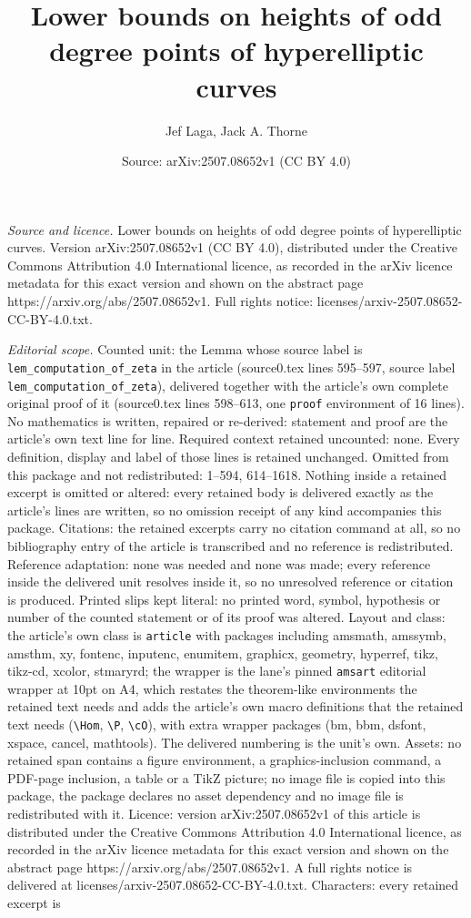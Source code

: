 \documentclass[10pt,a4paper]{amsart}
\title[Lower bounds on heights of odd degree points of hyperellipti]{Lower bounds on heights of odd degree points of hyperelliptic curves}
\author{Jef Laga, Jack A. Thorne}
\date{Source: arXiv:2507.08652v1 (CC BY 4.0)}
\begin{document}
\maketitle

\noindent\emph{Source and licence.} Lower bounds on heights of odd degree points of hyperelliptic curves. Version arXiv:2507.08652v1 (CC BY 4.0), distributed under the Creative Commons Attribution 4.0 International licence, as recorded in the arXiv licence metadata for this exact version and shown on the abstract page https://arxiv.org/abs/2507.08652v1. Full rights notice: licenses/arxiv-2507.08652-CC-BY-4.0.txt.\par\smallskip

\noindent\textit{Editorial scope.} Counted unit: the Lemma whose source label is \texttt{lem\_computation\_of\_zeta} in the article (source0.tex lines 595--597, source label \texttt{lem\_computation\_of\_zeta}), delivered together with the article's own complete original proof of it (source0.tex lines 598--613, one \texttt{proof} environment of 16 lines). No mathematics is written, repaired or re-derived: statement and proof are the article's own text line for line. Required context retained uncounted: none. Every definition, display and label of those lines is retained unchanged. Omitted from this package and not redistributed: 1--594, 614--1618. Nothing inside a retained excerpt is omitted or altered: every retained body is delivered exactly as the article's lines are written, so no omission receipt of any kind accompanies this package. Citations: the retained excerpts carry no citation command at all, so no bibliography entry of the article is transcribed and no reference is redistributed. Reference adaptation: none was needed and none was made; every reference inside the delivered unit resolves inside it, so no unresolved reference or citation is produced. Printed slips kept literal: no printed word, symbol, hypothesis or number of the counted statement or of its proof was altered. Layout and class: the article's own class is \texttt{article} with packages including amsmath, amssymb, amsthm, xy, fontenc, inputenc, enumitem, graphicx, geometry, hyperref, tikz, tikz-cd, xcolor, stmaryrd; the wrapper is the lane's pinned \texttt{amsart} editorial wrapper at 10pt on A4, which restates the theorem-like environments the retained text needs and adds the article's own macro definitions that the retained text needs (\texttt{\textbackslash Hom}, \texttt{\textbackslash P}, \texttt{\textbackslash cO}), with extra wrapper packages (bm, bbm, dsfont, xspace, cancel, mathtools). The delivered numbering is the unit's own. Assets: no retained span contains a figure environment, a graphics-inclusion command, a PDF-page inclusion, a table or a TikZ picture; no image file is copied into this package, the package declares no asset dependency and no image file is redistributed with it. Licence: version arXiv:2507.08652v1 of this article is distributed under the Creative Commons Attribution 4.0 International licence, as recorded in the arXiv licence metadata for this exact version and shown on the abstract page https://arxiv.org/abs/2507.08652v1. A full rights notice is delivered at licenses/arxiv-2507.08652-CC-BY-4.0.txt. Characters: every retained excerpt is 
\end{document}
